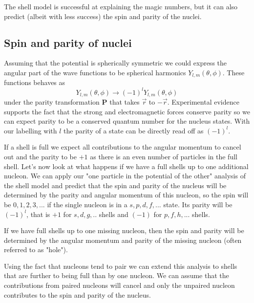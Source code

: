 \documentclass[12pt]{article}
\begin{document}
The shell model is successful at explaining the magic numbers, but it can also predict (albeit with less success) the spin and parity of the nuclei. 
\subsection{Spin and parity of nuclei}

Assuming that the potential is spherically symmetric we could express the angular part of the wave functions to be spherical harmonics $Y_{l,m}(\theta,\phi)$. These functions behaves as
\[Y_{l,m}(\theta,\phi)\rightarrow (-1)^l Y_{l,m}(\theta,\phi)\]
under the parity transformation $\mathbf{P}$ that takes $\vec{r}$ to $-\vec{r}$. Experimental evidence supports the fact that the strong and electromagnetic forces conserve parity so we can expect parity to be a conserved quantum number for the nucleus states. With our labelling with $l$ the parity of a state can be directly read off as $(-1)^l$.

If a shell is full we expect all contributions to the angular momentum to cancel out and the parity to be $+1$ as there is an even number of particles in the full shell. Let's now look at what happens if we have a full shells up to one additional nucleon. We can apply our "one particle in the potential of the other" analysis of the shell model and predict that the spin and parity of the nucleus will be determined by the parity and angular momentum of this nucleon, so the spin will be $0,1,2,3,...$ if the single nucleon is in a $s,p,d,f,...$ state. Its parity will be $(-1)^l$, that is $+1$ for $s,d,g,..$ shells and $(-1)$ for $p,f,h,...$ shells. 

If we have full shells up to one missing nucleon, then the spin and parity will be determined by the angular momentum and parity of the missing nucleon (often referred to as "hole").

Using the fact that nucleons tend to pair we can extend this analysis to shells that are further to being full than by one nucleon. We can assume that the contributions from paired nucleons will cancel and only the unpaired nucleon contributes to the spin and parity of the nucleus. 
\end{document}
